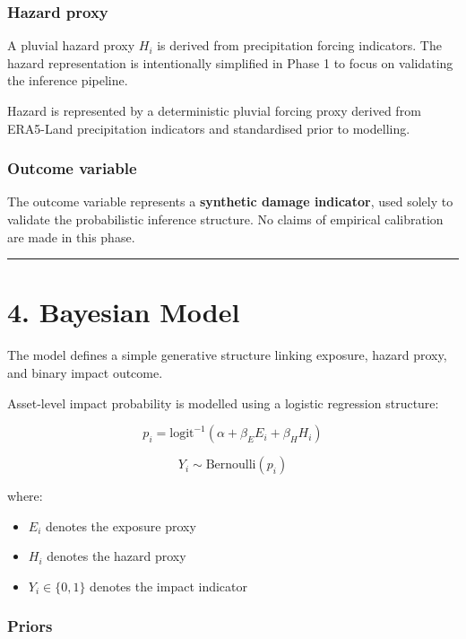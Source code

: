 \documentclass[
]{article}
\providecommand{\tightlist}{%
  \setlength{\itemsep}{0pt}\setlength{\parskip}{0pt}}
\begin{document}
\subsubsection{Hazard proxy}\label{hazard-proxy}

A pluvial hazard proxy \(H_i\) is derived from precipitation forcing
indicators. The hazard representation is intentionally simplified in
Phase 1 to focus on validating the inference pipeline.

Hazard is represented by a deterministic pluvial forcing proxy derived
from ERA5-Land precipitation indicators and standardised prior to
modelling.

\subsubsection{Outcome variable}\label{outcome-variable}

The outcome variable represents a \textbf{synthetic damage indicator},
used solely to validate the probabilistic inference structure. No claims
of empirical calibration are made in this phase.

\begin{center}\rule{0.5\linewidth}{0.5pt}\end{center}

\section{4. Bayesian Model}\label{bayesian-model}

The model defines a simple generative structure linking exposure, hazard
proxy, and binary impact outcome.

Asset-level impact probability is modelled using a logistic regression
structure:

\[
p_i =
\text{logit}^{-1}
\left(
\alpha + \beta_E E_i + \beta_H H_i
\right)
\]

\[
Y_i \sim \text{Bernoulli}(p_i)
\]

where:

\begin{itemize}
\tightlist
\item
  \(E_i\) denotes the exposure proxy
\item
  \(H_i\) denotes the hazard proxy
\item
  \(Y_i \in \{0,1\}\) denotes the impact indicator
\end{itemize}

\subsubsection{Priors}\label{priors}
\end{document}
